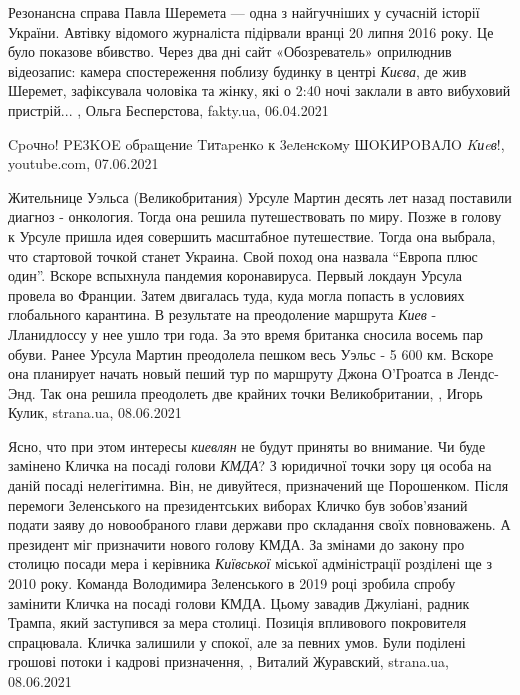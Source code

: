 Резонансна справа Павла Шеремета — одна з найгучніших у сучасній історії
України. Автівку відомого журналіста підірвали вранці 20 липня 2016 року. Це
було показове вбивство. Через два дні сайт «Обозреватель» оприлюднив
відеозапис: камера спостереження поблизу будинку в центрі \emph{Києва}, де жив
Шеремет, зафіксувала чоловіка та жінку, які о 2:40 ночі заклали в авто
вибуховий пристрій...
, 
Ольга Бесперстова, fakty.ua, 06.04.2021

Cpoчнo! PE3KOE oбpaщeниe Tитapeнкo к 3eлeнcкoмy ШOKИPOBAЛO \emph{Kиeв}!,
youtube.com, 07.06.2021

Жительнице Уэльса (Великобритания) Урсуле Мартин десять лет назад поставили
диагноз - онкология. Тогда она решила путешествовать по миру.  Позже в голову к
Урсуле пришла идея совершить масштабное путешествие. Тогда она выбрала, что
стартовой точкой станет Украина. Свой поход она назвала \enquote{Европа плюс
один}.  Вскоре вспыхнула пандемия коронавируса. Первый локдаун Урсула провела
во Франции. Затем двигалась туда, куда могла попасть в условиях глобального
карантина.  В результате на преодоление маршрута \emph{Киев} - Лланидлоссу у
нее ушло три года. За это время британка сносила восемь пар обуви.  Ранее
Урсула Мартин преодолела пешком весь Уэльс - 5 600 км. Вскоре она планирует
начать новый пеший тур по маршруту Джона О'Гроатса в Лендс-Энд. Так она решила
преодолеть две крайних точки Великобритании,
, Игорь Кулик, strana.ua, 08.06.2021

Ясно, что при этом интересы \emph{киевлян} не будут приняты во внимание. Чи буде
замінено Кличка на посаді голови \emph{КМДА}?  З юридичної точки зору ця особа на
даній посаді нелегітимна. Він, не дивуйтеся, призначений ще Порошенком.  Після
перемоги Зеленського на президентських виборах Кличко був зобов'язаний подати
заяву до новообраного глави держави про складання своїх повноважень. А
президент міг призначити нового голову КМДА.  За змінами до закону про столицю
посади мера і керівника \emph{Київської} міської адміністрації розділені ще з 2010
року.  Команда Володимира Зеленського в 2019 році зробила спробу замінити
Кличка на посаді голови КМДА. Цьому завадив Джуліані, радник Трампа, який
заступився за мера столиці.  Позиція впливового покровителя спрацювала. Кличка
залишили у спокої, але за певних умов. Були поділені грошові потоки і кадрові
призначення,
, Виталий Журавский, strana.ua, 08.06.2021

